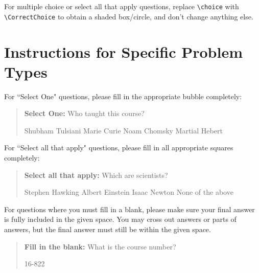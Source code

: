 \documentclass[11pt,addpoints,answers]{exam}
\numberwithin{equation}{section} %
\numberwithin{figure}{section} %
\numberwithin{table}{section} %
\begin{document}
For multiple choice or select all that apply questions, replace \lstinline{\choice} with \lstinline{\CorrectChoice} to obtain a shaded box/circle, and don't change anything else.

\clearpage

\section*{Instructions for Specific Problem Types}

For ``Select One" questions, please fill in the appropriate bubble completely:

\begin{quote}
\textbf{Select One:} Who taught this course?
     \begin{checkboxes}
     \CorrectChoice Shubham Tulsiani
     \choice Marie Curie
     \choice Noam Chomsky
     \choice Martial Hebert
    \end{checkboxes}
\end{quote}

For ``Select all that apply" questions, please fill in all appropriate squares completely:

\begin{quote}
\textbf{Select all that apply:} Which are scientists?
{
    \checkboxchar{$\Box$} \checkedchar{$\blacksquare$}
    \begin{checkboxes}
     \CorrectChoice Stephen Hawking
     \CorrectChoice Albert Einstein
     \CorrectChoice Isaac Newton
     \choice None of the above
    \end{checkboxes}
    }
\end{quote}

For questions where you must fill in a blank, please make sure your final answer is fully included in the given space. You may cross out answers or parts of answers, but the final answer must still be within the given space.

\begin{quote}
\textbf{Fill in the blank:} What is the course number?

\begin{tcolorbox}[fit,height=1cm, width=4cm, blank, borderline={1pt}{-2pt},nobeforeafter, halign=center, valign=center]
    \begin{center}\huge16-822\end{center}
    \end{tcolorbox}\hspace{2cm}
\end{quote}
\end{document}
